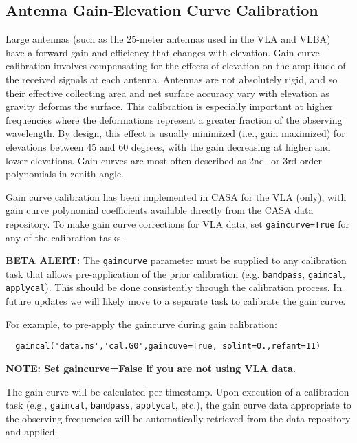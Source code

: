 \subsection{Antenna Gain-Elevation Curve Calibration}
\label{section:cal.prior.curves}

Large antennas (such as the 25-meter antennas used
in the VLA and VLBA) have a forward gain and efficiency that changes with
elevation. Gain curve calibration involves compensating for the effects of
elevation on the amplitude of the received signals at each antenna.
Antennas are not absolutely rigid, and so their effective collecting
area and net surface accuracy vary with elevation as gravity deforms
the surface.  This calibration is especially important at higher
frequencies where the deformations represent a greater fraction of the
observing wavelength.  By design, this effect is usually minimized
(i.e., gain maximized) for elevations between 45 and 60 degrees, with
the gain decreasing at higher and lower elevations.  Gain curves are
most often described as 2nd- or 3rd-order polynomials in zenith angle.

Gain curve calibration has been implemented in CASA
for the VLA (only), with gain curve polynomial coefficients available
directly from the CASA data repository.  To make gain curve
corrections for VLA data, set {\tt gaincurve=True}
for any of the calibration tasks.

{\bf BETA ALERT:} The {\tt gaincurve} parameter must be supplied
to any calibration task that allows pre-application of the prior
calibration (e.g. {\tt bandpass}, {\tt gaincal}, {\tt applycal}).
This should be done consistently through the calibration process.
In future updates we will likely move to a separate task to
calibrate the gain curve.

For example, to pre-apply the gaincurve during gain calibration:
\small
\begin{verbatim}
  gaincal('data.ms','cal.G0',gaincuve=True, solint=0.,refant=11)
\end{verbatim}
\normalsize
{\bf NOTE: Set gaincurve=False if you are not using VLA data.}

The gain curve will be calculated per timestamp.  Upon execution of a
calibration task (e.g., {\tt gaincal}, {\tt bandpass}, {\tt applycal}, 
etc.), the gain
curve data appropriate to the observing frequencies will be
automatically retrieved from the data repository and applied.

